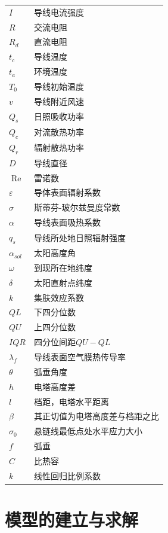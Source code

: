 \documentclass[a4paper,12.045pt]{ctexart}
\begin{document}
\begin{center}
\begin{longtable}{>{\centering\arraybackslash}m{5cm}>{\centering\arraybackslash}m{9cm}}
			\hline
			\endlastfoot
			$I$  & 导线电流强度 \\
			$R$  & 交流电阻 \\
			$R_{d}$  & 直流电阻 \\
			$t_{c}$  & 导线温度 \\
			$t_{a}$  & 环境温度 \\
			$T_{0}$  & 导线初始温度 \\
			$v$  & 导线附近风速 \\
			$Q_{s}$  & 日照吸收功率 \\
			$Q_{c}$  & 对流散热功率 \\
			$Q_{r}$  & 辐射散热功率 \\
			$D$  & 导线直径 \\
			$\operatorname{Re}$  & 雷诺数 \\
			$\varepsilon$  & 导体表面辐射系数 \\
			$\sigma$  & 斯蒂芬-玻尔兹曼度常数 \\
			$\alpha$  & 导线表面吸热系数 \\
			$q_{s}$  & 导线所处地日照辐射强度 \\
			$\alpha _{sol}$  & 太阳高度角 \\
			$\omega$  & 到现所在地纬度 \\
			$\delta$  & 太阳直射点纬度 \\
			$k$  & 集肤效应系数 \\
			$QL$  & 下四分位数 \\
			$QU$  & 上四分位数 \\
			$IQR$  & 四分位间距$QU-QL$ \\
			$\lambda_{f}$  & 导线表面空气膜热传导率 \\
			$\theta $  & 弧垂角度 \\
			$h $  & 电塔高度差 \\
			$l $  & 档距，电塔水平距离\\
			$\beta $  & 其正切值为电塔高度差与档距之比\\
			$\sigma_{0} $  & 悬链线最低点处水平应力大小\\
			$f $  & 弧垂\\
			$C $ & 比热容\\
			$k $ & 线性回归比例系数\\
		\end{longtable}
	\end{center}

	
	
	\section{模型的建立与求解}
\end{document}
